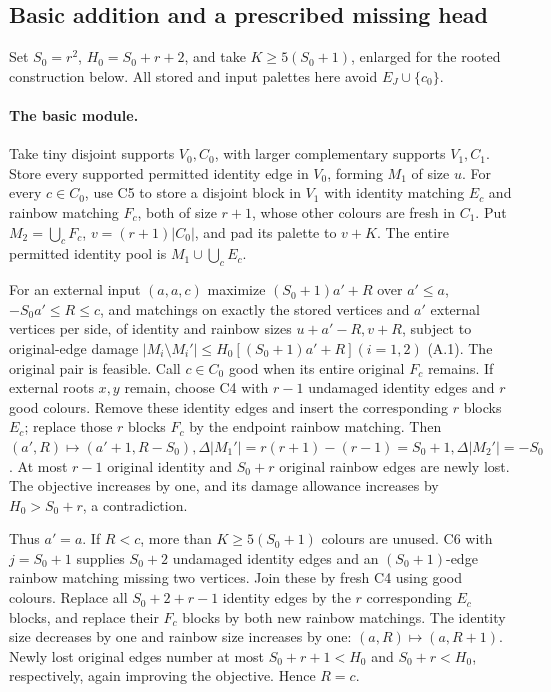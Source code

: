 \subsection{Basic addition and a prescribed missing head}
\label{sg:lem:basic}\label{sg:lem:addition}
\label{rphys:section}\label{rphys:module}
\label{sec:rooted-ordinary-checkpoint}

Set $S_0=r^2$, $H_0=S_0+r+2$, and take $K\ge5(S_0+1)$, enlarged for the rooted construction below. All stored and input palettes here avoid $E_J\cup\{c_0\}$.

\paragraph{The basic module.}
Take tiny disjoint supports $V_0,C_0$, with larger complementary supports $V_1,C_1$.  Store every supported permitted identity edge in $V_0$, forming $M_1$ of size $u$.  For every $c\in{}C_0$, use C5 to store a disjoint block in $V_1$ with identity matching $E_c$ and rainbow matching $F_c$, both of size $r+1$, whose other colours are fresh in $C_1$.  Put $M_2=\bigcup_cF_c$, $v=(r+1)|C_0|$, and pad its palette to $v+K$.  The entire permitted identity pool is $M_1\cup\bigcup_cE_c$.

For an external input $(a,a,c)$ maximize $(S_0+1)a'+R$ over $a'\le{}a$, $-S_0a'\le{}R\le{}c$, and matchings on exactly the stored vertices and $a'$ external vertices per side, of identity and rainbow sizes $u+a'-R,v+R$, subject to original-edge damage $|M_i\setminus{}M_i'|\le{}H_0[(S_0+1)a'+R](i=1,2)$ \textup{(A.1)}. The original pair is feasible.  Call $c\in{}C_0$ good when its entire original $F_c$ remains.  If external roots $x,y$ remain, choose C4 with $r-1$ undamaged identity edges and $r$ good colours. Remove these identity edges and insert the corresponding $r$ blocks $E_c$; replace those $r$ blocks $F_c$ by the endpoint rainbow matching.  Then $(a',R)\mapsto(a'+1,R-S_0),\Delta|M_1'|=r(r+1)-(r-1)=S_0+1,\Delta|M_2'|=-S_0$. At most $r-1$ original identity and $S_0+r$ original rainbow edges are newly lost.  The objective increases by one, and its
damage allowance increases by $H_0>S_0+r$, a contradiction.

Thus $a'=a$.  If $R<c$, more than $K\ge5(S_0+1)$ colours are unused.  C6 with $j=S_0+1$ supplies $S_0+2$ undamaged identity edges and an $(S_0+1)$-edge rainbow matching missing two vertices. Join these by fresh C4 using good colours.  Replace all $S_0+2+r-1$ identity edges by the $r$ corresponding $E_c$ blocks, and replace their $F_c$ blocks by both new rainbow matchings. The identity size decreases by one and rainbow size increases by
one: $(a,R)\mapsto(a,R+1)$.  Newly lost original edges number at most $S_0+r+1<H_0$ and $S_0+r<H_0$, respectively, again improving the objective.  Hence $R=c$.

